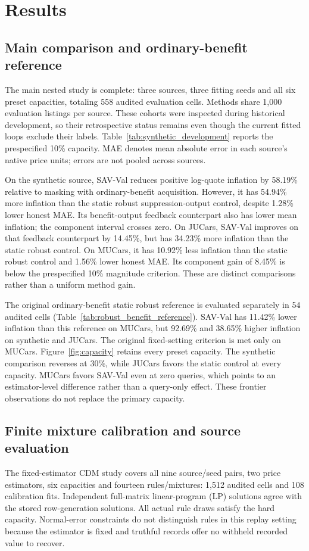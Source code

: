 \section{Results}
\label{sec:results}
\subsection{Main comparison and ordinary-benefit reference}
The main nested study is complete: three sources, three fitting seeds and all
six preset capacities, totaling 558 audited evaluation cells. Methods share
1,000 evaluation listings per source. These cohorts were inspected during
historical development, so their retrospective status remains even though the
current fitted loops exclude their labels. Table~\ref{tab:synthetic_development}
reports the prespecified 10\% capacity. MAE denotes mean absolute error in
each source's native price units; errors are not pooled across sources.

On the synthetic source, SAV-Val reduces positive log-quote inflation by
58.19\% relative to masking with ordinary-benefit acquisition. However, it has
54.94\% more inflation than the static robust suppression-output control,
despite 1.28\% lower honest MAE. Its benefit-output feedback counterpart also
has lower mean inflation; the component interval crosses zero.
On JUCars, SAV-Val improves on that feedback counterpart by 14.45\%, but has
34.23\% more inflation than the static robust control. On MUCars, it has
10.92\% less inflation than the static robust control and 1.56\% lower honest
MAE. Its component gain of 8.45\% is below the prespecified 10\% magnitude
criterion. These are distinct comparisons rather than a uniform method gain.

The original ordinary-benefit static robust reference is evaluated separately
in 54 audited cells (Table~\ref{tab:robust_benefit_reference}). SAV-Val has
11.42\% lower inflation than this reference on MUCars, but 92.69\% and
38.65\% higher inflation on synthetic and JUCars. The original fixed-setting
criterion is met only on MUCars. Figure~\ref{fig:capacity} retains every preset
capacity. The synthetic comparison reverses at 30\%, while JUCars favors the
static control at every capacity. MUCars favors SAV-Val even at zero queries,
which points to an estimator-level difference rather than a query-only effect.
These frontier observations do not replace the primary capacity.

\subsection{Finite mixture calibration and source evaluation}
The fixed-estimator CDM study covers all nine source/seed pairs, two price
estimators, six capacities and fourteen rules/mixtures: 1,512 audited cells
and 108 calibration fits. Independent full-matrix linear-program (LP)
solutions agree with the
stored row-generation solutions. All actual rule draws satisfy the hard
capacity. Normal-error constraints do not distinguish rules in this replay
setting because the estimator is fixed and truthful records offer no withheld
recorded value to recover.


